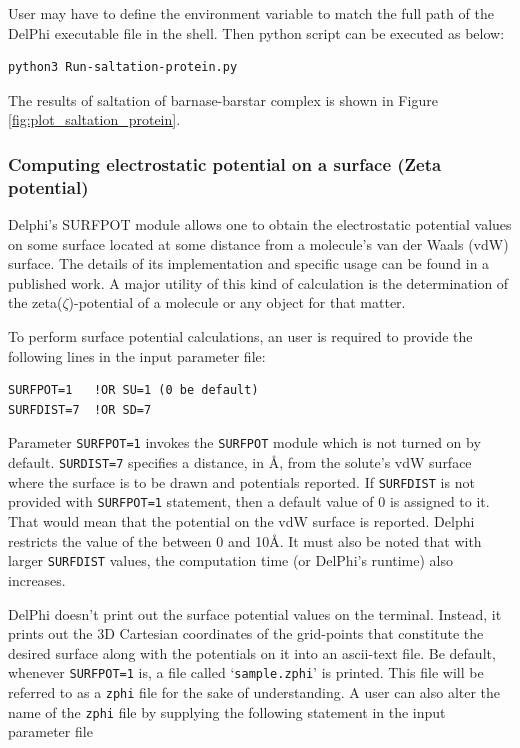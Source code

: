 \documentclass[9pt,tutorial]{livecoms}
\newcommand*\ttvar[1]{\texttt{\expandafter\dottvar\detokenize{#1}\relax}}
\newcommand*\dottvar[1]{\ifx\relax#1\else
  \expandafter\ifx\string_#1\string_\allowbreak\else#1\fi
  \expandafter\dottvar\fi}
\begin{document}
User may have to define the environment variable \ttvar{\$DELPHI_EXE} to match the full path of the DelPhi executable file in the shell. Then python script can be executed as below:

\begin{verbatim}
python3 Run-saltation-protein.py
\end{verbatim}

The results of saltation of barnase-barstar complex is shown in Figure \ref{fig:plot_saltation_protein}.

\subsubsection{Computing electrostatic potential on a surface (Zeta potential)} Delphi’s SURFPOT module allows one to obtain the electrostatic potential values on some surface located at some distance from a molecule’s van der Waals (vdW) surface. The details of its implementation and specific usage can be found in a published work\cite{chakravorty2017new}. A major utility of this kind of calculation is the determination of the zeta($\zeta$)-potential of a molecule or any object for that matter. 

To perform surface potential calculations, an user is required to provide the following lines in the input parameter file:

\begin{verbatim}
SURFPOT=1   !OR SU=1 (0 be default)
SURFDIST=7  !OR SD=7
\end{verbatim}

Parameter \texttt{SURFPOT=1} invokes the \texttt{SURFPOT} module which is not turned on by default. \texttt{SURDIST=7} specifies a distance, in Å, from the solute’s vdW surface where the surface is to be drawn and potentials reported. If \texttt{SURFDIST} is not provided with \texttt{SURFPOT=1} statement, then a default value of 0 is assigned to it. That would mean that the potential on the vdW surface is reported. Delphi restricts the value of the  between 0 and 10Å. It must also be noted that with larger \texttt{SURFDIST} values, the computation time (or DelPhi’s runtime) also increases. 

DelPhi doesn’t print out the surface potential values on the terminal. Instead, it prints out the 3D Cartesian coordinates of the grid-points that constitute the desired surface along with the potentials on it into an ascii-text file. Be default, whenever \texttt{SURFPOT=1} is, a file called ‘\texttt{sample.zphi}’ is printed. This file will be referred to as a \texttt{zphi} file for the sake of understanding. A user can also alter the name of the \texttt{zphi} file by supplying the following statement in the input parameter file
\end{document}
